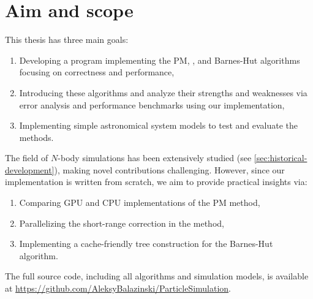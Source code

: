 \section{Aim and scope}
This thesis has three main goals:
\begin{enumerate}
    \item Developing a program implementing the PM, \PThreeM{}, and Barnes-Hut algorithms focusing on correctness and performance,
    \item Introducing these algorithms and analyze their strengths and weaknesses via error analysis and performance benchmarks using our implementation,
    \item Implementing simple astronomical system models to test and evaluate the methods.
\end{enumerate}
The field of $N$-body simulations has been extensively studied (see \autoref{sec:historical-development}), making novel contributions challenging.
However, since our implementation is written from scratch, we aim to provide practical insights via:
\begin{enumerate}
    \item Comparing GPU and CPU implementations of the PM method,
    \item Parallelizing the short-range correction in the \PThreeM{} method,
    \item Implementing a cache-friendly tree construction for the Barnes-Hut algorithm.
\end{enumerate}
The full source code, including all algorithms and simulation models, is available at \url{https://github.com/AleksyBalazinski/ParticleSimulation}.